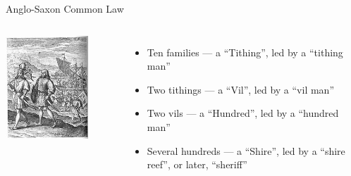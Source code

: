 \begin{frame}{Anglo-Saxon Common Law}
    \begin{columns}[onlytextwidth]
            \centering
            \includegraphics[width=0.75\textwidth]{img/hengist-horsa.png} \\

            \begin{itemize}
                \item Ten families --- a ``Tithing'', led by a ``tithing man''
                \item Two tithings --- a ``Vil'', led by a ``vil man''
                \item Two vils --- a ``Hundred'', led by a ``hundred man''
                \item Several hundreds --- a ``Shire'', led by a ``shire reef'', or later, ``sheriff''
            \end{itemize}
    \end{columns}
\end{frame}

